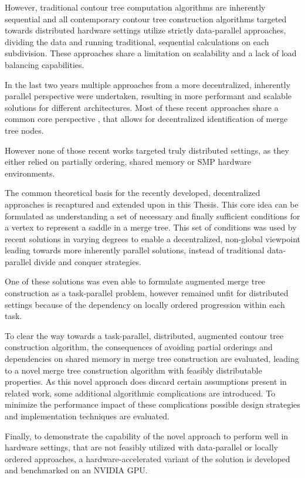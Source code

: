 \documentclass{scrartcl}
\begin{document}
However, traditional contour tree computation algorithms are inherently sequential and all contemporary contour tree construction algorithms targeted towards distributed hardware settings utilize strictly data-parallel approaches, dividing the data and running traditional, sequential calculations on each subdivision. These approaches share a limitation on scalability and a lack of load balancing capabilities. 

In the last two years multiple approaches from a more decentralized, inherently parallel perspective were undertaken, resulting in more performant and scalable solutions for different architectures. Most of these recent approaches share a common core perspective \cite{base}, that allows for decentralized identification of merge tree nodes.

However none of those recent works targeted truly distributed settings, as they either relied on partially ordering, shared memory or SMP hardware environments.

The common theoretical basis for the recently developed, decentralized approaches is recaptured and extended upon in this Thesis. This core idea can be formulated as understanding a set of necessary and finally sufficient conditions for a vertex to represent a saddle in a merge tree. This set of conditions was used by recent solutions in varying degrees to enable a decentralized, non-global viewpoint leading towards more inherently parallel solutions, instead of traditional data-parallel divide and conquer strategies. 

One of these solutions \cite{FTM} was even able to formulate augmented merge tree construction as a task-parallel problem, however remained unfit for distributed settings because of the dependency on locally ordered progression within each task. 

To clear the way towards a task-parallel, distributed, augmented contour tree construction algorithm, the consequences of avoiding partial orderings and dependencies on shared memory in merge tree construction are evaluated, leading to a novel merge tree construction algorithm with feasibly distributable properties. As this novel approach does discard certain assumptions present in related work, some additional algorithmic complications are introduced. To minimize the performance impact of these complications possible design strategies and implementation techniques are evaluated. 

Finally, to demonstrate the capability of the novel approach to perform well in hardware settings, that are not feasibly utilized with data-parallel or locally ordered approaches, a hardware-accelerated variant of the solution is developed and benchmarked on an NVIDIA GPU. 
\end{document}
